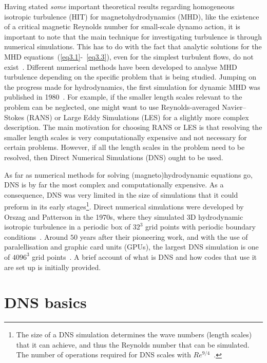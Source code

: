 \documentclass[12pt,a4paper]{report}
\begin{document}
Having stated \textit{some} important theoretical results regarding homogeneous isotropic turbulence (HIT) for magnetohydrodynamics (MHD), like the existence of a critical magnetic Reynolds number for small-scale dynamo action, it is important to note that the main technique for investigating turbulence is through numerical simulations. This has to do with the fact that analytic solutions for the MHD equations~(\ref{eq3.1}-~\ref{eq3.3}), even for the simplest turbulent flows, do not exist~\cite{moin1998direct}. Different numerical methods have been developed to analyse MHD turbulence depending on the specific problem that is being studied. Jumping on the progress made for hydrodynamics, the first simulation for  dynamic MHD was published in 1980~\cite{norman2010historical}. For example, if the smaller length scales relevant to the problem can be neglected, one might want to use Reynolds-averaged Navier–Stokes (RANS) or Large Eddy Simulations (LES) for a slightly more complex description. The main motivation for choosing RANS or LES is that resolving the smaller length scales is very computationally expensive and not necessary for certain problems. However, if all the length scales in the problem need to be resolved, then Direct Numerical Simulations (DNS) ought to be used. 

As far as numerical methods for solving (magneto)hydrodynamic equations go, DNS is by far the most complex and computationally expensive. As a consequence, DNS was very limited in the size of simulations that it could preform in its early stages\footnote{The size of a DNS simulation determines the wave numbers (length scales) that it can achieve, and thus the Reynolds number that can be simulated. The number of operations required for DNS scales with $Re^{9/4}$~\cite{mccomb1990physics}.}. Direct numerical simulations were developed by Orszag and Patterson in the 1970s, where they simulated 3D hydrodynamic isotropic turbulence in a periodic box of $32^3$ grid points with periodic boundary conditions~\cite{orszag1970analytical}. Around $50$ years after their pioneering work, and with the use of paralellisation and graphic card units (GPUs), the largest DNS simulation is one of $4096^3$ grid points~\cite{yokota2013petascale}. A brief account of what is DNS and how codes that use it are set up is initially provided. 

\section{DNS basics}
\label{sec4.1}
\end{document}
